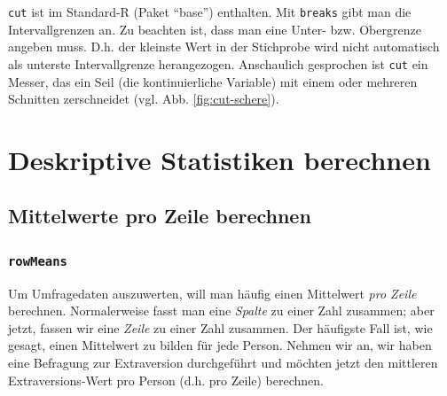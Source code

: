 \documentclass[12pt,ngerman,]{book}
\makeatletter
\newenvironment{Shaded}{\begin{snugshade}}{\end{snugshade}}
\newcommand{\KeywordTok}[1]{\textcolor[rgb]{0.13,0.29,0.53}{\textbf{{#1}}}}
\newcommand{\StringTok}[1]{\textcolor[rgb]{0.31,0.60,0.02}{{#1}}}
\newcommand{\CommentTok}[1]{\textcolor[rgb]{0.56,0.35,0.01}{\textit{{#1}}}}
\newcommand{\NormalTok}[1]{{#1}}
\newenvironment{kframe}{%
\medskip{}
\setlength{\fboxsep}{.8em}
 \def\at@end@of@kframe{}%
 \ifinner\ifhmode%
  \def\at@end@of@kframe{\end{minipage}}%
  \begin{minipage}{\columnwidth}%
 \fi\fi%
 \def\FrameCommand##1{\hskip\@totalleftmargin \hskip-\fboxsep
 \colorbox{shadecolor}{##1}\hskip-\fboxsep
     \hskip-\linewidth \hskip-\@totalleftmargin \hskip\columnwidth}%
 \MakeFramed {\advance\hsize-\width
   \@totalleftmargin\z@ \linewidth\hsize
   \@setminipage}}%
 {\par\unskip\endMakeFramed%
 \at@end@of@kframe}
\renewenvironment{Shaded}{\begin{kframe}}{\end{kframe}}
\makeatother
\begin{document}
\texttt{cut} ist im Standard-R (Paket ``base'') enthalten. Mit
\texttt{breaks} gibt man die Intervallgrenzen an. Zu beachten ist, dass
man eine Unter- bzw. Obergrenze angeben muss. D.h. der kleinste Wert in
der Stichprobe wird nicht automatisch als unterste Intervallgrenze
herangezogen. Anschaulich gesprochen ist \texttt{cut} ein Messer, das
ein Seil (die kontinuierliche Variable) mit einem oder mehreren
Schnitten zerschneidet (vgl. Abb. \ref{fig:cut-schere}).

\section{Deskriptive Statistiken
berechnen}\label{deskriptive-statistiken-berechnen}

\subsection{Mittelwerte pro Zeile
berechnen}\label{mittelwerte-pro-zeile-berechnen}

\subsubsection{\texorpdfstring{\texttt{rowMeans}}{rowMeans}}\label{rowmeans}

Um Umfragedaten auszuwerten, will man häufig einen Mittelwert \emph{pro
Zeile} berechnen. Normalerweise fasst man eine \emph{Spalte} zu einer
Zahl zusammen; aber jetzt, fassen wir eine \emph{Zeile} zu einer Zahl
zusammen. Der häufigste Fall ist, wie gesagt, einen Mittelwert zu bilden
für jede Person. Nehmen wir an, wir haben eine Befragung zur
Extraversion durchgeführt und möchten jetzt den mittleren
Extraversions-Wert pro Person (d.h. pro Zeile) berechnen.

\begin{Shaded}
\end{Shaded}
\end{document}
